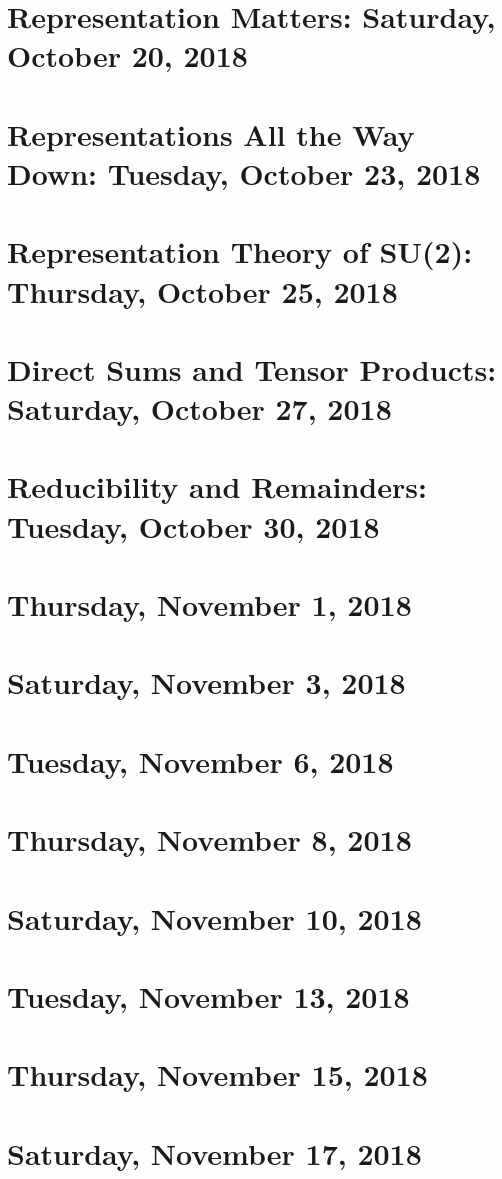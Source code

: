 \documentclass[reqno]{amsart}
\begin{document}
\section{Representation Matters: Saturday, October 20, 2018}
    
\section{Representations All the Way Down: Tuesday, October 23, 2018}
    
\section{Representation Theory of SU(2): Thursday, October 25, 2018}
    
\section{Direct Sums and Tensor Products: Saturday, October 27, 2018}
    
\section{Reducibility and Remainders: Tuesday, October 30, 2018}
    
\section{Thursday, November 1, 2018}
    
\section{Saturday, November 3, 2018}
    
\section{Tuesday, November 6, 2018}
    
\section{Thursday, November 8, 2018}
    
\section{Saturday, November 10, 2018}
    
\section{Tuesday, November 13, 2018}
    
\section{Thursday, November 15, 2018}
    
\section{Saturday, November 17, 2018}
    
\end{document}
